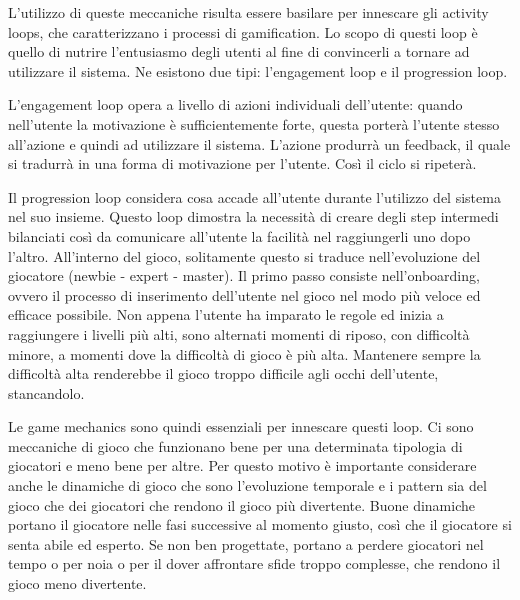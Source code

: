 L'utilizzo di queste meccaniche risulta essere basilare per innescare gli activity loops, che caratterizzano i processi di gamification.
Lo scopo di questi loop è quello di nutrire l'entusiasmo degli utenti al fine di convincerli a tornare ad utilizzare il sistema. Ne esistono due tipi: l'engagement loop e il progression loop.

L'engagement loop opera a livello di azioni individuali dell'utente: quando nell'utente la motivazione è sufficientemente forte, questa porterà l'utente stesso all'azione e quindi ad utilizzare il sistema. L'azione produrrà un feedback, il quale si tradurrà in una forma di motivazione per l'utente. Così il ciclo si ripeterà.

Il progression loop considera cosa accade all'utente durante l'utilizzo del sistema nel suo insieme. Questo loop dimostra la necessità di creare degli step intermedi bilanciati così da comunicare all'utente la facilità nel raggiungerli uno dopo l'altro. All'interno del gioco, solitamente questo si traduce nell'evoluzione del giocatore (newbie - expert - master). Il primo passo consiste nell'onboarding, ovvero il processo di inserimento dell'utente nel gioco nel modo più veloce ed efficace possibile. Non appena l'utente ha imparato le regole ed inizia a raggiungere i livelli più alti, sono alternati momenti di riposo, con difficoltà minore, a momenti dove la difficoltà di gioco è più alta. Mantenere sempre la difficoltà alta renderebbe il gioco troppo difficile agli occhi dell'utente, stancandolo.

Le game mechanics sono quindi essenziali per innescare questi loop. Ci sono meccaniche di gioco che funzionano bene per una determinata tipologia di giocatori e meno bene per altre. Per questo motivo è importante considerare anche le dinamiche di gioco che sono l'evoluzione temporale e i pattern sia del gioco che dei giocatori che rendono il gioco più divertente. Buone dinamiche portano il giocatore nelle fasi successive al momento giusto, così che il giocatore si senta abile ed esperto. Se non ben progettate, portano a perdere giocatori nel tempo o per noia o per il dover affrontare sfide troppo complesse, che rendono il gioco meno divertente.

